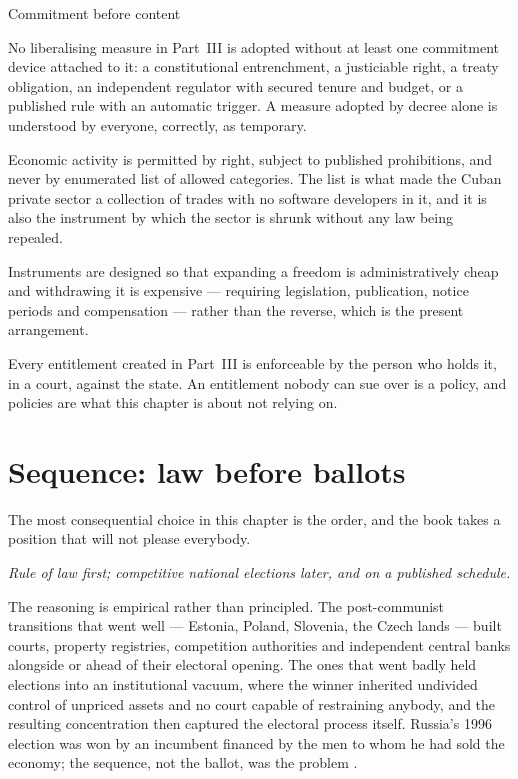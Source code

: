 \begin{design}{Commitment before content}
\label{d:commit}
\begin{rules}
 No liberalising measure in Part~III is adopted without at
least one commitment device attached to it: a constitutional entrenchment, a
justiciable right, a treaty obligation, an independent regulator with secured
tenure and budget, or a published rule with an automatic trigger. A measure
adopted by decree alone is understood by everyone, correctly, as temporary.

 Economic activity is permitted by right, subject to
published prohibitions, and never by enumerated list of allowed categories. The
list is what made the Cuban private sector a collection of trades with no
software developers in it, and it is also the instrument by which the sector is
shrunk without any law being repealed.

 Instruments are designed so that expanding a freedom is
administratively cheap and withdrawing it is expensive --- requiring
legislation, publication, notice periods and compensation --- rather than the
reverse, which is the present arrangement.

 Every entitlement created in Part~III is enforceable by the
person who holds it, in a court, against the state. An entitlement nobody can
sue over is a policy, and policies are what this chapter is about not relying
on.
\end{rules}
\end{design}

\section{Sequence: law before ballots}

The most consequential choice in this chapter is the order, and the book takes a
position that will not please everybody.

\emph{Rule of law first; competitive national elections later, and on a
published schedule.}

The reasoning is empirical rather than principled. The post-communist
transitions that went well --- Estonia, Poland, Slovenia, the Czech lands ---
built courts, property registries, competition authorities and independent
central banks alongside or ahead of their electoral opening. The ones that went
badly held elections into an institutional vacuum, where the winner inherited
undivided control of unpriced assets and no court capable of restraining
anybody, and the resulting concentration then captured the electoral process
itself. Russia's 1996 election was won by an incumbent financed by the men to
whom he had sold the economy; the sequence, not the ballot, was the problem
\citep{aslund2013}.

